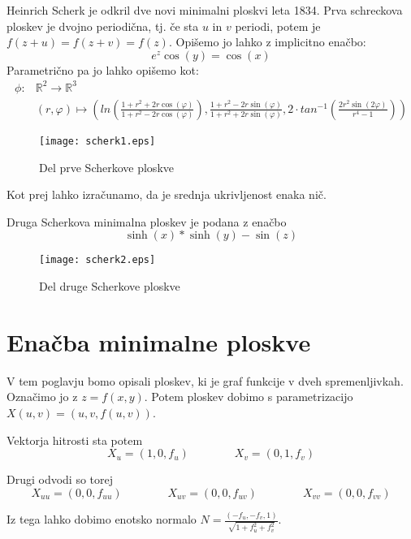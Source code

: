 \documentclass[mat1]{fmfdelo}
\newcommand{\R}{\mathbb R}
\begin{document}
\begin{primer}
    Heinrich Scherk je odkril dve novi minimalni ploskvi leta 1834. Prva schreckova ploskev je dvojno 
    periodična, tj. če sta $u$ in $v$ periodi, potem je $f(z + u) = f(z + v) = f(z)$. Opišemo jo lahko 
    z implicitno enačbo:
    $$ e^z \cos(y) = \cos(x) $$
    Parametrično pa jo lahko opišemo kot:
    \begin{align*}
        \phi : & \R^2 \to \R^3 \\
        & (r, \varphi) \mapsto \left( ln \left( \frac{1 + r^2 + 2 r \cos(\varphi)}{1 + r^2 - 2 r \cos(\varphi)}\right), \frac{1 + r^2 - 2 r \sin(\varphi)}{1 + r^2 + 2 r \sin(\varphi)}, 2 \cdot tan^{-1} \left( \frac{2 r^2 \sin(2 \varphi)}{r^4 - 1 }\right) \right)
    \end{align*}

    \begin{figure}[h]
        \texttt{[image: scherk1.eps]}
        \caption{Del prve Scherkove ploskve}
    \end{figure}

    Kot prej lahko izračunamo, da je srednja ukrivljenost enaka nič.
\end{primer}

\begin{primer}
    Druga Scherkova minimalna ploskev je podana z enačbo
    $$ \sinh(x) * \sinh(y) - \sin(z) $$

    \begin{figure}[h]
        \texttt{[image: scherk2.eps]}
        \caption{Del druge Scherkove ploskve}
    \end{figure}
\end{primer}


\section{Enačba minimalne ploskve}

V tem poglavju bomo opisali ploskev, ki je graf funkcije v dveh spremenljivkah. Označimo jo z $z = f(x, y)$. Potem ploskev dobimo
s parametrizacijo $X (u, v) = (u, v, f (u, v))$.

Vektorja hitrosti sta potem 
$$ X_u = (1, 0, f_u) \qquad \qquad X_v = (0, 1, f_v)  $$ 

Drugi odvodi so torej 
$$
    X_{uu} = (0, 0, f_{uu}) \qquad \qquad
    X_{uv} = (0, 0, f_{uv}) \qquad \qquad
    X_{vv} = (0, 0, f_{vv})
$$

Iz tega lahko dobimo enotsko normalo $N = \frac{(- f_u, - f_v, 1)}{\sqrt{1 + f_u^2 + f_v^2}}$.
\end{document}
